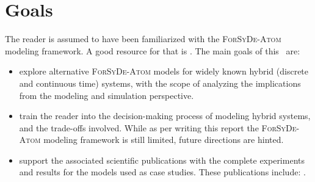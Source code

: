 
\section{Goals}
\label{sec:hybrid:goals}

The reader is assumed to have been familiarized with the \textsc{ForSyDe-Atom} modeling framework. A good resource for that is . The main goals of this \SelfRef\ are:
\begin{itemize}
\item explore alternative \textsc{ForSyDe-Atom} models for widely known hybrid (discrete and continuous time) systems, with the scope of analyzing the implications from the modeling and simulation perspective.
\item train the reader into the decision-making process of modeling hybrid systems, and the trade-offs involved. While as per writing this report the \textsc{ForSyDe-Atom} modeling framework is still limited, future directions are hinted.
\item support the associated scientific publications with the complete experiments and results for the models used as case studies. These publications include: \cite{ungureanu18a}.
\end{itemize}


